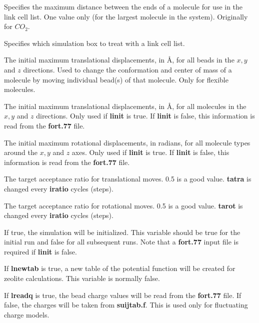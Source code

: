 \documentclass[12pt,letterpaper]{article}
\begin{document}
 Specifies the maximum distance between the ends of a molecule 
for use in the link cell list.  One value only (for the largest molecule in the system).
Originally for $CO_2$.

 Specifies which simulation box to treat with a
link cell list.

 The initial maximum translational
displacements, in {\AA}, for all beads in the $x, y$ and $z$ directions.
Used to change the conformation and center of mass of a molecule 
by moving individual bead(s) of that molecule.  Only for flexible molecules.

 The initial maximum translational
displacements, in {\AA}, for all molecules in the $x, y$ and $z$ directions.  
Only used if {\textbf {linit}} is true.
If {\textbf{linit}} is false, this information is read from the {\textbf{ fort.77} }file.

 The initial maximum rotational
displacements, in radians, for all molecule types around the $x, y$ and $z$ axes.
Only used if {\textbf {linit}} is true.
If {\textbf{linit}} is false, this information is read from the {\textbf{ fort.77} }file.

 The target acceptance ratio for translational moves.
0.5 is a good value.  {\textbf{tatra}} is changed every {\textbf {iratio}} cycles (steps).

 The target acceptance ratio for rotational moves.
0.5 is a good value.  {\textbf{tarot}} is changed every {\textbf {iratio}} cycles (steps).

 If true, the simulation will be initialized.
This variable should be true for the initial run and false for all subsequent runs.  
Note that a {\textbf{fort.77}} input file is required if {\textbf{linit}} is false.

 If {\textbf{lnewtab}} is true, a new table of the potential function
will be created for zeolite calculations.  This variable is normally false.

 If {\textbf{lreadq}} is true, the bead charge values will be read from the
{\textbf{fort.77}} file.  If false, the charges will be taken from {\textbf{suijtab.f}}.
This is used only for fluctuating charge models.

\end{document}
